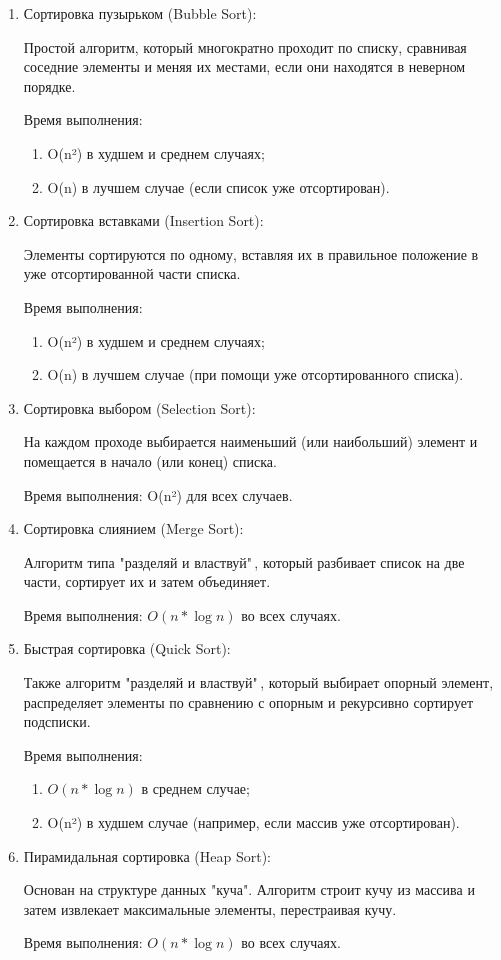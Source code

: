 \begin{enumerate}

\item Сортировка пузырьком (Bubble Sort):

Простой алгоритм, который многократно проходит по списку, сравнивая соседние элементы и меняя их местами, если они находятся в неверном порядке.

Время выполнения:
\begin{enumerate}
\item O(n²) в худшем и среднем случаях;
\item O(n) в лучшем случае (если список уже отсортирован).
\end{enumerate}

\item Сортировка вставками (Insertion Sort):

Элементы сортируются по одному, вставляя их в правильное положение в уже отсортированной части списка.

Время выполнения:
\begin{enumerate}
\item O(n²) в худшем и среднем случаях;
\item O(n) в лучшем случае (при помощи уже отсортированного списка).
\end{enumerate}

\item Сортировка выбором (Selection Sort):

На каждом проходе выбирается наименьший (или наибольший) элемент и помещается в начало (или конец) списка.

Время выполнения: O(n²) для всех случаев.

\item Сортировка слиянием (Merge Sort):

Алгоритм типа "разделяй и властвуй"\,, который разбивает список на две части, сортирует их и затем объединяет.

Время выполнения: \(O(n * \log n)\) во всех случаях.

\item Быстрая сортировка (Quick Sort):

Также алгоритм "разделяй и властвуй"\,, который выбирает опорный элемент, распределяет элементы по сравнению с опорным и рекурсивно сортирует подсписки.

Время выполнения:
\begin{enumerate}
\item \(O(n * \log n)\) в среднем случае;
\item O(n²) в худшем случае (например, если массив уже отсортирован).
\end{enumerate}

\item Пирамидальная сортировка (Heap Sort):

Основан на структуре данных "куча". Алгоритм строит кучу из массива и затем извлекает максимальные элементы, перестраивая кучу.

Время выполнения: \(O(n * \log n)\) во всех случаях.

\end{enumerate}

